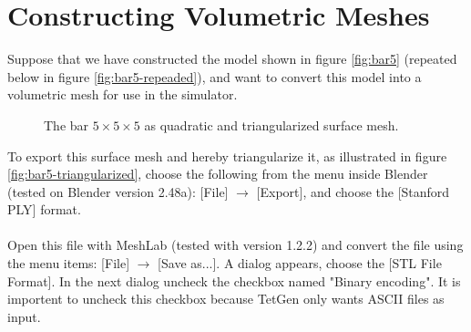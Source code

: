 
\chapter{Constructing Volumetric Meshes}
\label{sec:constructing-meshes}
Suppose that we have constructed the model shown in figure \vref{fig:bar5}
(repeated below in figure \ref{fig:bar5-repeaded}), and want to
convert this model into a volumetric mesh for use in the simulator.

\begin{figure}
  \centering
  \caption{The bar $5 \times 5 \times 5$ as quadratic and triangularized
    surface mesh.}
  \label{fig:bar}
\end{figure}

To export this surface mesh and hereby triangularize it, as illustrated
in figure \vref{fig:bar5-triangularized}, choose the following from the
menu inside Blender (tested on Blender version 2.48a):
[File] $\rightarrow$ [Export], and choose the [Stanford PLY] format. \\

 \\

Open this file with MeshLab (tested with version 1.2.2) and convert
the file using the menu items: [File] $\rightarrow$ [Save as...]. A
dialog appears, choose the [STL File Format]. In the next dialog
uncheck the checkbox named  "Binary encoding". It is importent to
uncheck this checkbox because TetGen only wants ASCII files as input. \\

